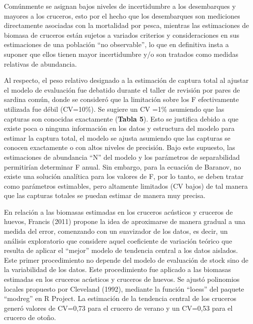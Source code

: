 \documentclass[
  spanish,
]{article}
\begin{document}
Comúnmente se asignan bajos niveles de incertidumbre a los desembarques
y mayores a los cruceros, esto por el hecho que los desembarques son
mediciones directamente asociadas con la mortalidad por pesca, mientras
las estimaciones de biomasa de cruceros están sujetos a variados
criterios y consideraciones en sus estimaciones de una población ``no
observable'', lo que en definitiva insta a suponer que ellos tienen
mayor incertidumbre y/o son tratados como medidas relativas de
abundancia.

Al respecto, el peso relativo designado a la estimación de captura total
al ajustar el modelo de evaluación fue debatido durante el taller de
revisión por pares de sardina común, donde se consideró que la
limitación sobre los F efectivamente utilizada fue débil (CV=10\%). Se
sugiere un CV =1\% asumiendo que las capturas son conocidas exactamente
(\textbf{Tabla 5}). Esto se justifica debido a que existe poca o ninguna
información en los datos y estructura del modelo para estimar la captura
total, el modelo se ajusta asumiendo que las capturas se conocen
exactamente o con altos niveles de precisión. Bajo este supuesto, las
estimaciones de abundancia ``N'' del modelo y los parámetros de
separabilidad permitirían determinar F anual. Sin embargo, para la
ecuación de Baranov, no existe una solución analítica para los valores
de F, por lo tanto, se deben tratar como parámetros estimables, pero
altamente limitados (CV bajos) de tal manera que las capturas totales se
puedan estimar de manera muy precisa.

En relación a las biomasas estimadas en los cruceros acústicos y
cruceros de huevos, Francis (2011) propone la idea de aproximarse de
manera gradual a una medida del error, comenzando con un suavizador de
los datos, es decir, un análisis exploratorio que considere aquel
coeficiente de variación teórico que resulta de aplicar el ``mejor''
modelo de tendencia central a los datos aislados. Este primer
procedimiento no depende del modelo de evaluación de stock sino de la
variabilidad de los datos. Este procedimiento fue aplicado a las
biomasas estimadas en los cruceros acústicos y cruceros de huevos. Se
ajustó polinomios locales propuesto por Cleveland (1992), mediante la
función ``loess'' del paquete ``modreg'' en R Project. La estimación de
la tendencia central de los cruceros generó valores de CV=0,73 para el
crucero de verano y un CV=0,53 para el crucero de otoño.
\end{document}
